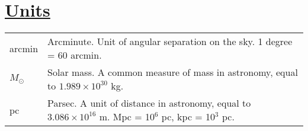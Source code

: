 \begin{acronym}[CFHTLenS]
\end{acronym}

\vspace{0.5cm}

\section*{\underline{Units}}
\begin{tabular}{p{0.6in}p{5.8in}}
arcmin & Arcminute. Unit of angular separation on the sky. 1 degree = 60 arcmin. \\
$M_{\odot}$ & Solar mass. A common measure of mass in astronomy, equal to $1.989 \times 10^{30}$ kg. \\
pc & Parsec. A unit of distance in astronomy, equal to $3.086 \times 10^{16}$ m. Mpc = 10$^6$ pc, kpc = 10$^3$ pc. \\
\end{tabular}

\vspace{0.5cm}

